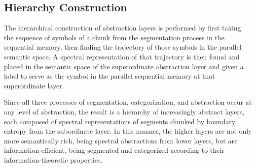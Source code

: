 \subsection{Hierarchy Construction}
\label{section:hierarch-construction}

The hierarchical construction of abstraction layers \citep{chella2008cognitive} is performed by first taking the sequence of symbols of a chunk from the segmentation process in the sequential memory, then finding the trajectory of those symbols in the parallel semantic space.  A spectral representation of that trajectory is then found and placed in the semantic space of the superordinate abstraction layer and given a label to serve as the symbol in the parallel sequential memory at that superordinate layer.

Since all three processes of segmentation, categorization, and abstraction occur at any level of abstraction, the result is a hierarchy of increasingly abstract layers, each composed of spectral representations of segments chunked by boundary entropy from the subordinate layer.  In this manner, the higher layers are not only more semantically rich, being spectral abstractions from lower layers, but are information-efficient, being segmented and categorized according to their information-theoretic properties.









